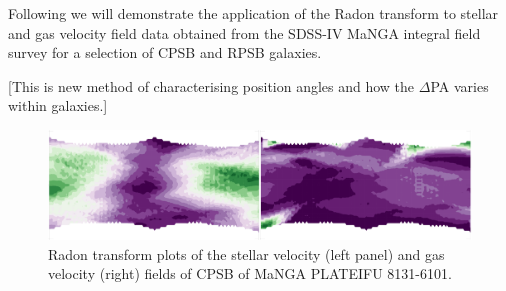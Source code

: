 Following \citet{2018MNRAS.480.2217S} we will demonstrate the application of the Radon transform to stellar and gas velocity field data obtained from the SDSS-IV MaNGA integral field survey for a selection of CPSB and RPSB galaxies.  

[This is new method of characterising position angles and how the $\Delta$PA varies within galaxies.]


\begin{figure}
    \centering
   	\includegraphics[width=0.8\columnwidth]{images/RadonPlots/RT-snips/CPSB-8313-6101-RT-snip.png}
    \caption{Radon transform plots of the stellar velocity (left panel) and gas velocity (right) fields of CPSB of MaNGA PLATEIFU 8131-6101.}
    \label{fig:RT_8131-6101}
\end{figure}









